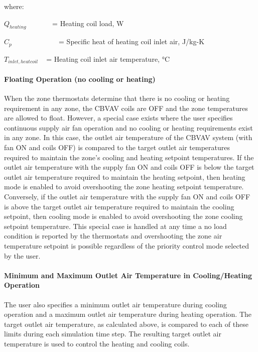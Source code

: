 where:

\({Q_{heating}}\) ~~~~~~ = Heating coil load, W

\({C_p}\) ~~~~~~~~~~~~ = Specific heat of heating coil inlet air, J/kg-K

\({T_{inlet,heatcoil}}\) ~ = Heating coil inlet air temperature, °C

\paragraph{Floating Operation (no cooling or heating)}\label{floating-operation-no-cooling-or-heating}

When the zone thermostats determine that there is no cooling or heating requirement in any zone, the CBVAV coils are OFF and the zone temperatures are allowed to float. However, a special case exists where the user specifies continuous supply air fan operation and no cooling or heating requirements exist in any zone. In this case, the outlet air temperature of the CBVAV system (with fan ON and coils OFF) is compared to the target outlet air temperatures required to maintain the zone's cooling and heating setpoint temperatures. If the outlet air temperature with the supply fan ON and coils OFF is below the target outlet air temperature required to maintain the heating setpoint, then heating mode is enabled to avoid overshooting the zone heating setpoint temperature. Conversely, if the outlet air temperature with the supply fan ON and coils OFF is above the target outlet air temperature required to maintain the cooling setpoint, then cooling mode is enabled to avoid overshooting the zone cooling setpoint temperature. This special case is handled at any time a no load condition is reported by the thermostats and overshooting the zone air temperature setpoint is possible regardless of the priority control mode selected by the user.

\paragraph{Minimum and Maximum Outlet Air Temperature in Cooling/Heating Operation}\label{minimum-and-maximum-outlet-air-temperature-in-coolingheating-operation}

The user also specifies a minimum outlet air temperature during cooling operation and a maximum outlet air temperature during heating operation. The target outlet air temperature, as calculated above, is compared to each of these limits during each simulation time step. The resulting target outlet air temperature is used to control the heating and cooling coils.

